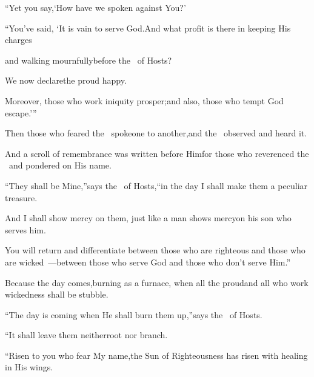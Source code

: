 \begin{inparaenum}
  \pb ``Yet you say,\pa `How have we spoken against You?'%
  
  \pa {} ``You've said, `It is vain to serve God.\pa And what profit is there in keeping His charges%
  
  \pb and walking mournfully\pa before the \lord\ of Hosts?%
  
  \pa {} We now declare\pa the proud happy.%
  
  \pb Moreover, those who work iniquity prosper;\pa and also, those who tempt God escape.'\thinspace''%
  
  \pa {} Then those who feared the \lord\ spoke\pa one to another,\pa and the \lord\ observed and heard it.%
  
  \pb And a scroll of remembrance was written before Him\pa for those who reverenced the \lord\ and pondered on His name.%
  
  \pa {} ``They shall be Mine,''\pa says the \lord\ of Hosts,\pa ``in the day I shall make them a peculiar treasure.%
  
  \pb And I shall show mercy on them, just like a man shows mercy\pa on his son who serves him.%
  
  \pa {} You will return and differentiate between those who are righteous and those who are wicked~---\pa between those who serve God and those who don't serve Him.''%
  
  \pa {}%
  Because the day comes,\pa burning as a furnace,%
  \pa when all the proud\pa and all who work wickedness shall be stubble.%
  
  \pb ``The day is coming when He shall burn them up,''\pa says the \lord\ of Hosts.%
  
  \pb ``It shall leave them neither\pa root nor branch.%
  
  \pa {} ``Risen to you who fear My name,\pa the Sun%
  of Righteousness has risen with healing in His wings.%
  

\end{inparaenum}
